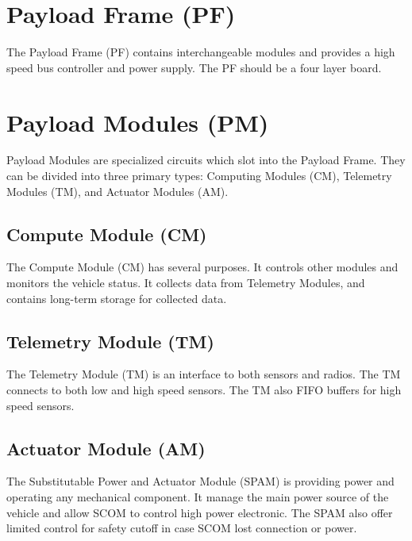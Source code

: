 \documentclass[12pt,article]{memoir}
\begin{document}
\section{Payload Frame (PF)}
The Payload Frame (PF) contains interchangeable modules and provides a high speed bus controller and power supply. The PF should be a four layer board.
\section{Payload Modules (PM)}
Payload Modules are specialized circuits which slot into the Payload Frame. They can be divided into three primary types: Computing Modules (CM), Telemetry Modules (TM), and Actuator Modules (AM).
\subsection{Compute Module (CM)}
The Compute Module (CM) has several purposes. It controls other modules and monitors the vehicle status. It collects data from Telemetry Modules, and contains long-term storage for collected data. 
\subsection{Telemetry Module (TM)}
The Telemetry Module (TM) is an interface to both sensors and radios. The TM connects to both low and high speed sensors. The TM also FIFO buffers for high speed sensors.
\subsection{Actuator Module (AM)}%
The Substitutable Power and Actuator Module (SPAM) is providing power and operating any mechanical component. It manage the main power source of the vehicle and allow SCOM to control high power electronic. The SPAM also offer limited control for safety cutoff in case SCOM lost connection or power.
\end{document}
